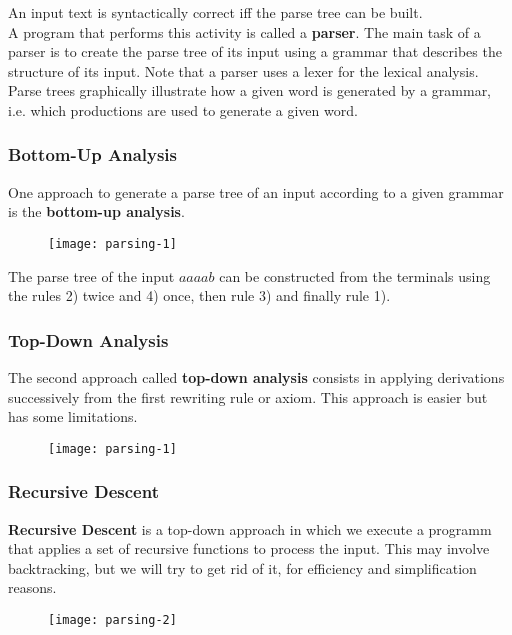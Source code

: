 An input text is syntactically correct iff the parse tree can be built.\\

A program that performs this activity is called a \textbf{parser}. The main
task of a parser is to create the parse tree of its input using a
grammar that describes the structure of its input. Note that a
parser uses a lexer for the lexical analysis.\\

Parse trees graphically illustrate how a given word is generated by a grammar, i.e. 
which productions are used to generate a given word.

\subsubsection{Bottom-Up Analysis}
One approach to generate a parse tree of an input according to a given grammar is the \textbf{bottom-up analysis}.
\begin{figure}[H]
  \centering
  \texttt{[image: parsing-1]}
\end{figure}
The parse tree of the input $aaaab$ can be constructed from the terminals
using the rules 2) twice and 4) once, then rule 3) and finally rule 1).
\subsubsection{Top-Down Analysis}
The second approach called \textbf{top-down analysis} consists in applying derivations successively from the first
rewriting rule or axiom. This approach is easier but has some limitations.
\begin{figure}[H]
  \centering
  \texttt{[image: parsing-1]}
\end{figure}
\subsubsection{Recursive Descent}
\textbf{Recursive Descent} is a top-down approach in which we execute a programm that applies a set 
of recursive functions to process the input. This may involve backtracking, but we will try
to get rid of it, for efficiency and simplification reasons.
\begin{figure}[H]
  \centering
  \texttt{[image: parsing-2]}
\end{figure}
